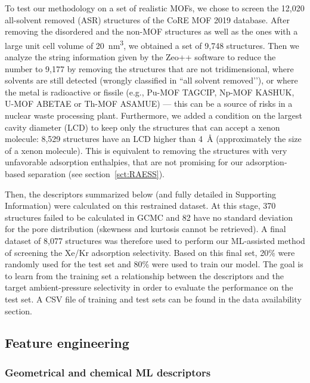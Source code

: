 \documentclass[main]{subfiles}
\begin{document}
To test our methodology on a set of realistic MOFs, we chose to screen the 12,020 all-solvent removed (ASR) structures of the CoRE MOF 2019 database\autocite{Chung_2019}. After removing the disordered and the non-MOF structures as well as the ones with a large unit cell volume of \SI{20}{\cubic\nano\meter}, we obtained a set of 9,748 structures. Then we analyze the string information given by the Zeo++ software\autocite{zeopp_Willems2012} to reduce the number to 9,177 by removing the structures that are not tridimensional, where solvents are still detected (wrongly classified in ``all solvent removed’’), or where the metal is radioactive or fissile (e.g., Pu-MOF TAGCIP\autocite{Diwu_2010}, Np-MOF KASHUK\autocite{Martin_2017}, U-MOF ABETAE\autocite{Jouffret_2011} or Th-MOF ASAMUE\autocite{Liang_2016}) --- this can be a source of risks in a nuclear waste processing plant. Furthermore, we added a condition on the largest cavity diameter (LCD) to keep only the structures that can accept a xenon molecule: 8,529 structures have an LCD higher than \SI{4}{\angstrom} (approximately the size of a xenon molecule). This is equivalent to removing the structures with very unfavorable adsorption enthalpies, that are not promising for our adsorption-based separation (see section~\ref{sct:RAESS}).

Then, the descriptors summarized below (and fully detailed in Supporting Information) were calculated on this restrained dataset. At this stage, 370 structures failed to be calculated in GCMC and 82 have no standard deviation for the pore distribution (skewness and kurtosis cannot be retrieved). A final dataset of 8,077 structures was therefore used to perform our ML-assisted method of screening the Xe/Kr adsorption selectivity. Based on this final set, {20\%} were randomly used for the test set and {80\%} were used to train our model. The goal is to learn from the training set a relationship between the descriptors and the target ambient-pressure selectivity in order to evaluate the performance on the test set. A CSV file of training and test sets can be found in the data availability section.

\subsection{Feature engineering}

\subsubsection{Geometrical and chemical ML descriptors}
\end{document}
